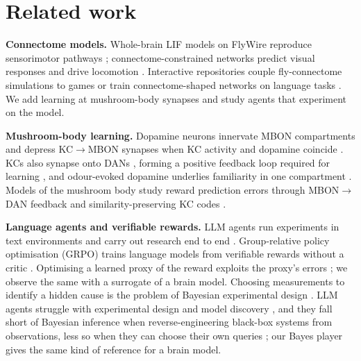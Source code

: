 \documentclass{article}
\begin{document}
\section{Related work}
\textbf{Connectome models.} Whole-brain LIF models on FlyWire reproduce sensorimotor pathways \citep{shiu2024}; connectome-constrained networks predict visual responses \citep{lappalainen2024} and drive locomotion \citep{jin2026}. Interactive repositories couple fly-connectome simulations to games \citep{flyescape} or train connectome-shaped networks on language tasks \citep{flyaslm2026}. We add learning at mushroom-body synapses and study agents that experiment on the model.

\textbf{Mushroom-body learning.} Dopamine neurons innervate MBON compartments and depress KC$\rightarrow$MBON synapses when KC activity and dopamine coincide \citep{aso2014,hige2015}. KCs also synapse onto DANs \citep{li2020}, forming a positive feedback loop required for learning \citep{cervantes2017}, and odour-evoked dopamine underlies familiarity in one compartment \citep{hattori2017}. Models of the mushroom body study reward prediction errors through MBON$\rightarrow$DAN feedback \citep{bennett2021} and similarity-preserving KC codes \citep{dasgupta2017}.

\textbf{Language agents and verifiable rewards.} LLM agents run experiments in text environments \citep{wang2022scienceworld,jansen2024discoveryworld} and carry out research end to end \citep{lu2024aiscientist}. Group-relative policy optimisation (GRPO) trains language models from verifiable rewards without a critic \citep{shao2024,deepseekr1}. Optimising a learned proxy of the reward exploits the proxy's errors \citep{gao2023}; we observe the same with a surrogate of a brain model. Choosing measurements to identify a hidden cause is the problem of Bayesian experimental design \citep{chaloner1995}. LLM agents struggle with experimental design and model discovery \citep{gandhi2025boxinggym}, and they fall short of Bayesian inference when reverse-engineering black-box systems from observations, less so when they can choose their own queries \citep{geng2025blackbox}; our Bayes player gives the same kind of reference for a brain model.
\end{document}
